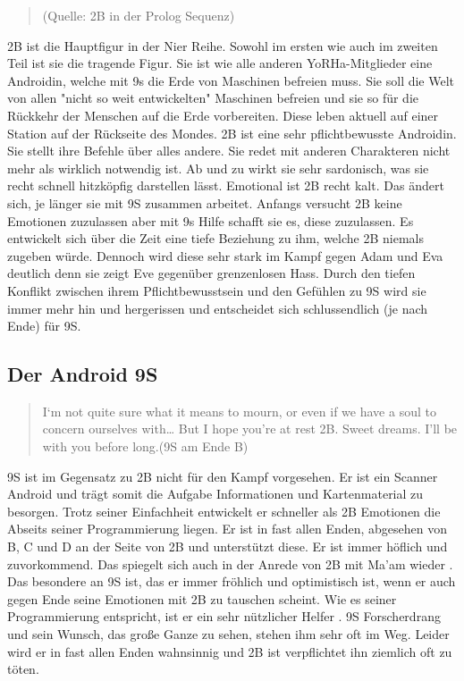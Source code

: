\begin{quote}
	(Quelle: 2B in der Prolog Sequenz)
\end{quote}
2B ist die Hauptfigur in der Nier Reihe. Sowohl im ersten wie auch im zweiten Teil ist sie die tragende Figur. Sie ist wie alle anderen YoRHa-Mitglieder eine Androidin, welche mit 9s die Erde von Maschinen befreien muss. Sie soll die Welt von allen "nicht so weit entwickelten" Maschinen befreien und sie so für die Rückkehr der Menschen auf die Erde vorbereiten. Diese leben aktuell auf einer Station auf der Rückseite des Mondes.  2B ist eine sehr pflichtbewusste Androidin. Sie stellt ihre Befehle über alles andere. Sie redet mit anderen Charakteren nicht mehr als wirklich notwendig ist. Ab und zu wirkt sie sehr sardonisch, was sie recht schnell hitzköpfig darstellen lässt. Emotional ist 2B recht kalt. Das ändert sich, je länger sie mit 9S zusammen arbeitet. Anfangs versucht 2B keine Emotionen zuzulassen aber mit 9s Hilfe schafft sie es, diese zuzulassen. Es entwickelt sich über die Zeit eine tiefe Beziehung zu ihm, welche 2B niemals zugeben würde. Dennoch wird diese sehr stark im Kampf gegen \dq Adam und Eva \dq  deutlich denn sie zeigt Eve gegenüber grenzenlosen Hass. Durch den tiefen Konflikt zwischen ihrem Pflichtbewusstsein und den Gefühlen zu 9S wird sie immer mehr hin und hergerissen und entscheidet sich schlussendlich (je nach Ende) für 9S. ~\cite{automatawikia20192b}


\subsection{Der Android 9S}

\begin{quote}
	\dq I‘m not quite sure what it means to mourn, or even if we have a soul to concern ourselves with… But I hope you’re at rest 2B. Sweet dreams. I’ll be with you before long.\dq  \vspace{10px}(9S am Ende B)
\end{quote}
	9S ist im Gegensatz zu 2B nicht für den Kampf vorgesehen. Er ist ein Scanner Android und trägt somit die Aufgabe Informationen und Kartenmaterial zu besorgen. Trotz seiner \dq Einfachheit \dq entwickelt er schneller als 2B Emotionen die Abseits seiner Programmierung liegen. Er ist in fast allen Enden, abgesehen von B, C und D an der Seite von 2B und unterstützt diese. Er ist immer höflich und zuvorkommend. Das spiegelt sich auch in der Anrede von 2B mit \dq Ma'am \dq wieder . Das besondere an 9S ist, das er immer fröhlich und optimistisch ist, wenn er auch gegen Ende seine Emotionen mit 2B zu tauschen scheint. Wie es seiner Programmierung entspricht, ist er ein sehr nützlicher \dq Helfer \dq . 9S Forscherdrang und sein Wunsch, das große Ganze zu sehen, stehen ihm sehr oft im Weg. Leider wird er in fast allen Enden wahnsinnig und 2B ist verpflichtet ihn ziemlich oft zu töten. ~\cite{automatawikia20199S}

